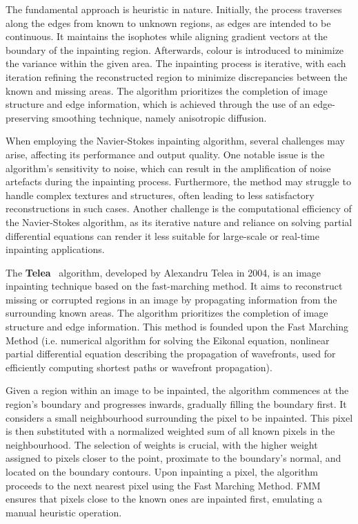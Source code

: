 The fundamental approach is heuristic in nature. Initially, the process traverses along the edges from known to unknown regions, as edges are intended to be continuous. It maintains the isophotes while aligning gradient vectors at the boundary of the inpainting region. Afterwards, colour is introduced to minimize the variance within the given area. The inpainting process is iterative, with each iteration refining the reconstructed region to minimize discrepancies between the known and missing areas. The algorithm prioritizes the completion of image structure and edge information, which is achieved through the use of an edge-preserving smoothing technique, namely anisotropic diffusion.

When employing the Navier-Stokes inpainting algorithm, several challenges may arise, affecting its performance and output quality. One notable issue is the algorithm's sensitivity to noise, which can result in the amplification of noise artefacts during the inpainting process. Furthermore, the method may struggle to handle complex textures and structures, often leading to less satisfactory reconstructions in such cases. Another challenge is the computational efficiency of the Navier-Stokes algorithm, as its iterative nature and reliance on solving partial differential equations can render it less suitable for large-scale or real-time inpainting applications.


The \textbf{Telea}~\supercite{telea} algorithm, developed by Alexandru Telea in 2004, is an image inpainting technique based on the fast-marching method. It aims to reconstruct missing or corrupted regions in an image by propagating information from the surrounding known areas. The algorithm prioritizes the completion of image structure and edge information. This method is founded upon the Fast Marching Method (i.e. numerical algorithm for solving the Eikonal equation, nonlinear partial differential equation describing the propagation of wavefronts, used for efficiently computing shortest paths or wavefront propagation).

Given a region within an image to be inpainted, the algorithm commences at the region's boundary and progresses inwards, gradually filling the boundary first. It considers a small neighbourhood surrounding the pixel to be inpainted. This pixel is then substituted with a normalized weighted sum of all known pixels in the neighbourhood. The selection of weights is crucial, with the higher weight assigned to pixels closer to the point, proximate to the boundary's normal, and located on the boundary contours. Upon inpainting a pixel, the algorithm proceeds to the next nearest pixel using the Fast Marching Method. FMM ensures that pixels close to the known ones are inpainted first, emulating a manual heuristic operation.

